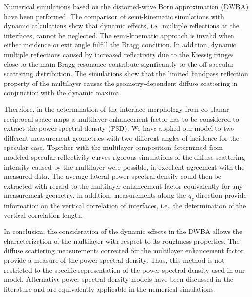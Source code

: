 \documentclass[twocolumn,osajnl,showpacs,superscriptaddress,11pt]{revtex4-1}
\begin{document}
Numerical simulations based on the distorted-wave Born approximation (DWBA) have been performed. The comparison of semi-kinematic simulations with dynamic calculations show that dynamic effects, i.e.~multiple reflections at the interfaces, cannot be neglected. The semi-kinematic approach is invalid when either incidence or exit angle fulfill the Bragg condition. In addition, dynamic multiple reflections caused by increased reflectivity due to the Kiessig fringes close to the main Bragg resonance contribute significantly to the off-specular scattering distribution. The simulations show that the limited bandpass reflection property of the multilayer causes the geometry-dependent diffuse scattering in conjunction with the dynamic maxima.

Therefore, in the determination of the interface morphology from co-planar reciprocal space maps a multilayer enhancement factor has to be considered to extract the power spectral density (PSD). We have applied our model to two different measurement geometries with two different angles of incidence for the specular case. Together with the multilayer composition determined from modeled specular reflectivity curves rigorous simulations of the diffuse scattering intensity caused by the multilayer were possible, in excellent agreement with the measured data. The average lateral power spectral density could then be extracted with regard to the multilayer enhancement factor equivalently for any measurement geometry. In addition, measurements along the $q_z$ direction provide information on the vertical correlation of interfaces, i.e.~the determination of the vertical correlation length. 

In conclusion, the consideration of the dynamic effects in the DWBA allows the characterization of the multilayer with respect to its roughness properties. The diffuse scattering measurements corrected for the multilayer enhancement factor provide a measure of the power spectral density. Thus, this method is not restricted to the specific representation of the power spectral density used in our model. Alternative power spectral density models have been discussed in the literature \cite{PhysRevB.38.2297, PhysRevB.48.2873} and are equivalently applicable in the numerical simulations.



\end{document}

